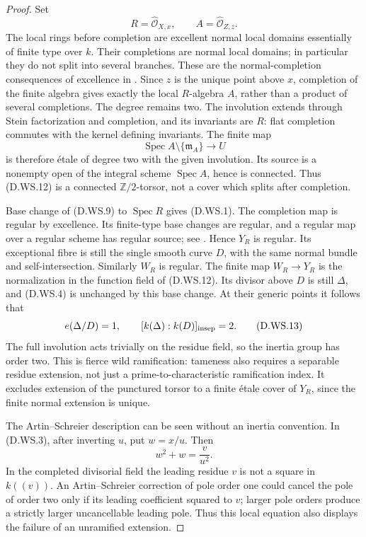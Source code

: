 \begin{proof}
Set
\[
       R=\widehat{\mathcal O}_{X,x},\qquad
       A=\widehat{\mathcal O}_{Z,z}.
                                                        \tag{D.WS.11}
\]
The local rings before completion are excellent normal local
domains essentially of finite type over $k$. Their completions
are normal local domains; in particular they do not split into
several branches. These are the normal-completion consequences
of excellence in \citet[Tags07QS,0C23 and0C22]
{C_StacksWildSwap}. Since $z$ is the unique point above $x$,
completion of the finite algebra gives exactly the local
$R$-algebra $A$, rather than a product of several completions.
The degree remains two. The involution extends through Stein
factorization and completion, and its invariants are $R$:
flat completion commutes with the kernel defining invariants.
The finite map
\[
 \operatorname{Spec}A\setminus\{\mathfrak m_A\}
                 \longrightarrow U
                                                        \tag{D.WS.12}
\]
is therefore \'etale of degree two with the given involution.
Its source is a nonempty open of the integral scheme
$\operatorname{Spec}A$, hence is connected. Thus (D.WS.12) is
a connected $\mathbb Z/2$-torsor, not a cover which splits after
completion.

Base change of (D.WS.9) to $\operatorname{Spec}R$ gives (D.WS.1).
The completion map is regular by excellence. Its finite-type
base changes are regular, and a regular map over a regular
scheme has regular source; see \citet[Tags07C1 and07QI]
{C_StacksWildSwap}. Hence $Y_R$ is regular. Its exceptional
fibre is still the single smooth curve $D$, with the same
normal bundle and self-intersection. Similarly $W_R$ is regular.
The finite map $W_R\to Y_R$ is the normalization in the function
field of (D.WS.12). Its divisor above $D$ is still $\Delta$,
and (D.WS.4) is unchanged by this base change. At their generic
points it follows that
\[
      e(\Delta/D)=1,\qquad
      [k(\Delta):k(D)]_{\rm insep}=2.
                                                        \tag{D.WS.13}
\]
The full involution acts trivially on the residue field, so
the inertia group has order two. This is fierce wild
ramification: tameness also requires a separable residue
extension, not just a prime-to-characteristic ramification
index. It excludes extension of the punctured torsor to a
finite \'etale cover of $Y_R$, since the finite normal
extension is unique.

The Artin--Schreier description can be seen without an
inertia convention. In (D.WS.3), after inverting $u$, put
$w=x/u$. Then
\[
                        w^2+w=\frac{v}{u^2}.
                                                        \tag{D.WS.14}
\]
In the completed divisorial field the leading residue $v$
is not a square in $k((v))$. An Artin--Schreier correction
of pole order one could cancel the pole of order two only
if its leading coefficient squared to $v$; larger pole
orders produce a strictly larger uncancellable leading
pole. Thus this local equation also displays the failure
of an unramified extension.


\end{proof}
